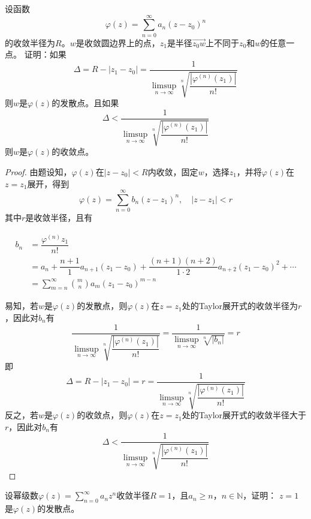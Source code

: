 \begin{lemma}\label{lemma:radius}

    设函数
    $$\varphi(z) = \sum\limits_{n = 0}^{\infty}{a_n (z - z_0)^n}$$
    的收敛半径为$R$。$w$是收敛圆边界上的点，$z_1$是半径$\vec{z_0w}$上不同于$z_0$和$w$的任意一点。
    证明：如果
    $$\Delta = R - |z_1 - z_0| = \dfrac{1}{\limsup\limits_{n \to \infty}{\sqrt[n]{\dfrac{|\varphi^{(n)}(z_1)|}{n!}}}}$$
    则$w$是$\varphi(z)$的发散点。且如果
    $$\Delta < \dfrac{1}{\limsup\limits_{n \to \infty}{\sqrt[n]{\dfrac{|\varphi^{(n)}(z_1)|}{n!}}}}$$
    则$w$是$\varphi(z)$的收敛点。

\end{lemma}

\begin{proof}

    由题设知，$\varphi(z)$在$|z - z_0| < R$内收敛，固定$w$，选择$z_1$，并将$\varphi(z)$在$z = z_1$展开，得到
    $$\varphi(z) = \sum\limits_{n = 0}^{\infty}{b_n (z - z_1)^n}, \quad |z - z_1| < r$$
    其中$r$是收敛半径，且有

    \begin{align*}
        b_n & = \dfrac{\varphi^{(n)}{z_1}}{n!} \\
        & = a_n + \dfrac{n + 1}{1}a_{n + 1}(z_1 - z_0) + \dfrac{(n + 1)(n + 2)}{1 \cdot 2}a_{n + 2}(z_1 - z_0)^2 + \cdots \\
        & = \sum\limits_{m = n}^{\infty}{\binom{m}{n}a_m(z_1 - z_0)^{m - n}}
    \end{align*}

    易知，若$w$是$\varphi(z)$的发散点，则$\varphi(z)$在$z = z_1$处的\textup{Taylor}展开式的收敛半径为$r$，因此对$b_n$有
    $$\dfrac{1}{\limsup\limits_{n \to \infty}{\sqrt[n]{\dfrac{|\varphi^{(n)}(z_1)|}{n!}}}} = \dfrac{1}{\limsup\limits_{n \to \infty}{\sqrt[n]{|b_n|}}} = r$$
    即
    $$\Delta = R - |z_1 - z_0| = r = \dfrac{1}{\limsup\limits_{n \to \infty}{\sqrt[n]{\dfrac{|\varphi^{(n)}(z_1)|}{n!}}}}$$
    反之，若$w$是$\varphi(z)$的收敛点，则$\varphi(z)$在$z = z_1$处的\textup{Taylor}展开式的收敛半径大于$r$，因此对$b_n$有
    $$\Delta < \dfrac{1}{\limsup\limits_{n \to \infty}{\sqrt[n]{\dfrac{|\varphi^{(n)}(z_1)|}{n!}}}}$$

\end{proof}

\begin{theorem}
    
    设幂级数$\varphi(z) = \sum\limits_{n = 0}^{\infty}{a_n z^n}$收敛半径$R = 1$，且$a_n \geq n$，$n \in \mathbb{N}$，证明：
    $z = 1$是$\varphi(z)$的发散点。

\end{theorem}

